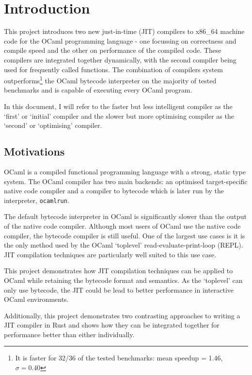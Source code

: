 \chapter{Introduction}

This project introduces two new just-in-time (JIT) compilers to x86\_64 machine code for the OCaml
programming language - one focussing on correctness and compile speed and the other on performance
of the compiled code.  These compilers are integrated together dynamically, with the second
compiler
being used for frequently called functions.  The combination of compilers system
outperforms\footnote{It is faster for 32/36 of the tested benchmarks: mean speedup = 1.46, $\sigma
            = 0.40$} the
OCaml bytecode interpreter on the majority of tested benchmarks and is capable of executing every
OCaml program.

In this document, I will refer to the faster but less intelligent compiler as the `first' or
`initial' compiler and the slower but more optimising compiler as the `second' or `optimising'
compiler.

\section{Motivations}

OCaml is a compiled functional programming language with a strong, static type system. The OCaml
compiler has two main backends: an optimised target-specific native code compiler and a compiler to
bytecode which is later run by the interpreter, \texttt{ocamlrun}.

The default bytecode interpreter in OCaml is significantly slower than the output of the native
code compiler. Although most users of OCaml use the native code compiler, the bytecode compiler is
still useful. One of the largest use cases is it is the only method used by the OCaml `toplevel'
read-evaluate-print-loop (REPL). JIT compilation techniques are particularly well suited to this
use case.

This project demonstrates how JIT compilation techniques can be applied to OCaml while retaining
the bytecode format and semantics. As the `toplevel' can only use
bytecode, the JIT could be lead to better performance in interactive OCaml environments.

Additionally, this project demonstrates two contrasting approaches to writing a JIT compiler in
Rust and shows how they can be integrated together for performance better than either individually.

